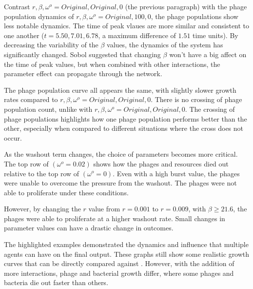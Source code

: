 Contrast $r, \beta, \omega^o=Original, Original, 0$ (the previous paragraph) with the phage population dynamics of $r, \beta, \omega^o = Original, 100, 0$, the phage populations show less notable dynamics. 
The time of peak vlaues are more similar and consistent to one another ($t=5.50, 7.01, 6.78$, a maximum difference of $1.51$ time units). 
By decreasing the variability of the $\beta$ values, the dynamics of the system has significantly changed. 
Sobol suggested that changing $\beta$ won't have a big affect on the time of peak values, but when combined with other interactions, the parameter effect can propagate through the network. 

The phage population curve all appears the same, with slightly slower growth rates compared to $r, \beta, \omega^o=Original, Original, 0$. 
There is no crossing of phage population count, unlike with $r, \beta, \omega^o=Original, Original, 0$. 
The crossing of phage populations highlights how one phage population performs better than the other, especially when compared to different situations where the cross does not occur. 

As the washout term changes, the choice of parameters becomes more critical. 
The top row of  $(\omega^o = 0.02)$ shows how the phages and resources died out relative to the top row of  $(\omega^o = 0)$. 
Even with a high burst value, the phages were unable to overcome the pressure from the washout. 
The phages were not able to proliferate under these conditions. 

However, by changing the $r$ value from $r=0.001$ to $r=0.009$, with $\beta \geq 21.6$, the phages were able to proliferate at a higher washout rate. 
Small changes in parameter values can have a drastic change in outcomes.

The highlighted examples demonstrated the dynamics and influence that multiple agents can have on the final output. 
These graphs still show some realistic growth curves that can be directly compared against . 
However, with the addition of more interactions, phage and bacterial growth differ, where some phages and bacteria die out faster than others. 

